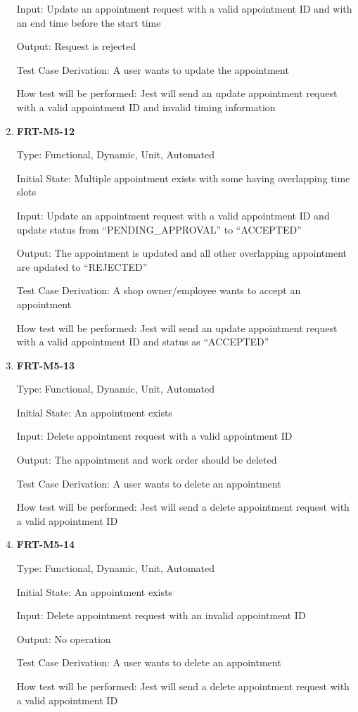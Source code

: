 \documentclass[12pt, titlepage]{article}
\begin{document}
\begin{enumerate}
	      Input: Update an appointment request with a valid appointment ID and with an end time before the
	      start time

	      Output: Request is rejected

	      Test Case Derivation: A user wants to update the appointment

	      How test will be performed: Jest will send an update appointment request with a valid appointment
	      ID and invalid timing information

	\item \textbf{FRT-M5-12}

	      Type: Functional, Dynamic, Unit, Automated

	      Initial State: Multiple appointment exists with some having overlapping time slots

	      Input: Update an appointment request with a valid appointment ID and update status from
	      ``PENDING\_APPROVAL'' to ``ACCEPTED''

	      Output: The appointment is updated and all other overlapping appointment are updated to
	      ``REJECTED''

	      Test Case Derivation: A shop owner/employee wants to accept an appointment

	      How test will be performed: Jest will send an update appointment request with a valid appointment
	      ID and status as ``ACCEPTED''

	\item \textbf{FRT-M5-13}

	      Type: Functional, Dynamic, Unit, Automated

	      Initial State: An appointment exists

	      Input: Delete appointment request with a valid appointment ID

	      Output: The appointment and work order should be deleted

	      Test Case Derivation: A user wants to delete an appointment

	      How test will be performed: Jest will send a delete appointment request with a valid appointment ID

	\item \textbf{FRT-M5-14}

	      Type: Functional, Dynamic, Unit, Automated

	      Initial State: An appointment exists

	      Input: Delete appointment request with an invalid appointment ID

	      Output: No operation

	      Test Case Derivation: A user wants to delete an appointment

	      How test will be performed: Jest will send a delete appointment request with a valid appointment ID

\end{enumerate}
\end{document}
